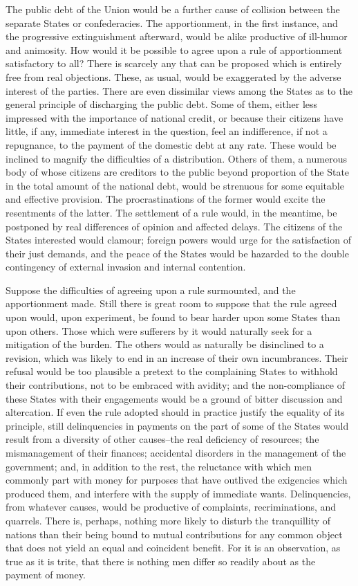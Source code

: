 The public debt of the Union would be a further cause of collision between the separate States or confederacies. 
The apportionment, in the first instance, and the progressive extinguishment afterward, would be alike productive of ill-humor and animosity. 
How would it be possible to agree upon a rule of apportionment satisfactory to all? 
There is scarcely any that can be proposed which is entirely free from real objections. 
These, as usual, would be exaggerated by the adverse interest of the parties. 
There are even dissimilar views among the States as to the general principle of discharging the public debt. 
Some of them, either less impressed with the importance of national credit, or because their citizens have little, if any, immediate interest in the question, feel an indifference, if not a repugnance, to the payment of the domestic debt at any rate. 
These would be inclined to magnify the difficulties of a distribution. 
Others of them, a numerous body of whose citizens are creditors to the public beyond proportion of the State in the total amount of the national debt, would be strenuous for some equitable and effective provision. 
The procrastinations of the former would excite the resentments of the latter. 
The settlement of a rule would, in the meantime, be postponed by real differences of opinion and affected delays. 
The citizens of the States interested would clamour; foreign powers would urge for the satisfaction of their just demands, and the peace of the States would be hazarded to the double contingency of external invasion and internal contention.

Suppose the difficulties of agreeing upon a rule surmounted, and the apportionment made. 
Still there is great room to suppose that the rule agreed upon would, upon experiment, be found to bear harder upon some States than upon others. 
Those which were sufferers by it would naturally seek for a mitigation of the burden. 
The others would as naturally be disinclined to a revision, which was likely to end in an increase of their own incumbrances. 
Their refusal would be too plausible a pretext to the complaining States to withhold their contributions, not to be embraced with avidity; and the non-compliance of these States with their engagements would be a ground of bitter discussion and altercation. 
If even the rule adopted should in practice justify the equality of its principle, still delinquencies in payments on the part of some of the States would result from a diversity of other causes--the real deficiency of resources; the mismanagement of their finances; accidental disorders in the management of the government; and, in addition to the rest, the reluctance with which men commonly part with money for purposes that have outlived the exigencies which produced them, and interfere with the supply of immediate wants. 
Delinquencies, from whatever causes, would be productive of complaints, recriminations, and quarrels. 
There is, perhaps, nothing more likely to disturb the tranquillity of nations than their being bound to mutual contributions for any common object that does not yield an equal and coincident benefit. 
For it is an observation, as true as it is trite, that there is nothing men differ so readily about as the payment of money.

